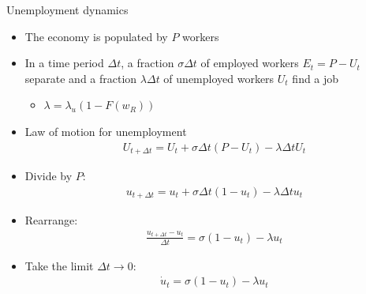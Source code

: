 \documentclass[9pt]{beamer}
\newcommand{\bit}{\begin{itemize}}
\newcommand{\eit}{\end{itemize}}
\begin{document}
\begin{frame}{Unemployment dynamics}

\bit
\setlength\itemsep{1em}

\item The economy is populated by $P$ workers

\item In a time period $\Delta t$, a fraction $\sigma \Delta t$ of employed workers $E_t = P-U_t$ separate and a fraction $\lambda\Delta t$ of unemployed workers  $U_t$ find a job
\bit
	\item $\lambda = \lambda_u (1-F(w_R))$
\eit

\item Law of motion for unemployment
\begin{eqnarray}
U_{t+\Delta t} = U_t + \sigma \Delta t (P-U_t) - \lambda \Delta t U_t \nonumber
\end{eqnarray}

\item Divide by $P$:
\begin{eqnarray}
u_{t+\Delta t} = u_t + \sigma \Delta t (1-u_t) - \lambda \Delta t u_t \nonumber
\end{eqnarray}

\item Rearrange:
\begin{eqnarray}
\frac{u_{t+\Delta t}-u_t}{\Delta t} = \sigma (1-u_t) - \lambda u_t \nonumber
\end{eqnarray}

\item Take the limit $\Delta t \rightarrow 0$:
\begin{eqnarray}
\dot u_t = \sigma (1-u_t) -\lambda u_t \nonumber
\end{eqnarray}
%

\eit


\end{frame}
\end{document}
